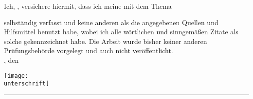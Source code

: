 \clearpage
{}

Ich, \autorName, versichere hiermit, dass ich meine \textbf{\betreff} mit dem
Thema
\begin{quote}
\textit{\kompletterTitel}
\end{quote}
selbständig verfasst und keine anderen als die angegebenen Quellen und Hilfsmittel benutzt habe, wobei ich alle wörtlichen und sinngemäßen Zitate als solche gekennzeichnet habe. Die Arbeit wurde bisher keiner anderen Prüfungsbehörde vorgelegt und auch nicht veröffentlicht.\\[6ex]

\abgabeOrt, den \abgabeTermin

\texttt{[image: \\unterschrift]}
\par 	
\vspace{-1.1cm}

\rule[-0.2cm]{5.5cm}{0.5pt}

\textsc{\autorName}
